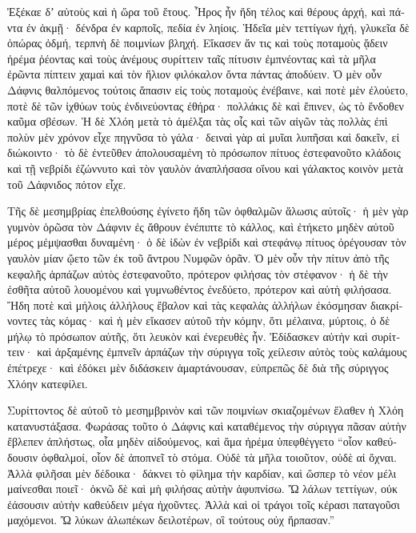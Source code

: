 \documentclass{book}
\begin{document}
\begin{pairs}
\begin{Leftside}
\begin{greek}
  Ἐξέκαε δʼ αὐτοὺς καὶ ἡ ὥρα τοῦ ἔτους. Ἦρος ἦν ἤδη τέλος καὶ θέρους ἀρχή, καὶ πάντα ἐν ἀκμῇ· δένδρα ἐν καρποῖς, πεδία ἐν ληίοις. Ἡδεῖα μὲν τεττίγων ἠχή, γλυκεῖα δὲ ὀπώρας ὀδμή, τερπνὴ δὲ ποιμνίων βληχή.  Εἴκασεν ἄν τις καὶ τοὺς ποταμοὺς ᾅδειν ἠρέμα ῥέοντας καὶ τοὺς ἀνέμους συρίττειν ταῖς πίτυσιν ἐμπνέοντας καὶ τὰ μῆλα ἐρῶντα πίπτειν χαμαὶ καὶ τὸν ἥλιον φιλόκαλον ὄντα πάντας ἀποδύειν. Ὁ μὲν οὖν Δάφνις θαλπόμενος τούτοις ἅπασιν εἰς τοὺς ποταμοὺς ἐνέβαινε, καὶ ποτὲ μὲν ἐλούετο, ποτὲ δὲ τῶν ἰχθύων τοὺς ἐνδινεύοντας ἐθήρα· πολλάκις δὲ καὶ ἔπινεν, ὡς τὸ ἔνδοθεν καῦμα σβέσων.  Ἡ δὲ Χλόη μετὰ τὸ ἀμέλξαι τὰς οἶς καὶ τῶν αἰγῶν τὰς πολλὰς ἐπὶ πολὺν μὲν χρόνον εἶχε πηγνῦσα τὸ γάλα· δειναὶ γὰρ αἱ μυῖαι λυπῆσαι καὶ δακεῖν, εἰ διώκοιντο· τὸ δὲ ἐντεῦθεν ἀπολουσαμένη τὸ πρόσωπον πίτυος ἐστεφανοῦτο κλάδοις καὶ τῇ νεβρίδι ἐζώννυτο καὶ τὸν γαυλὸν ἀναπλήσασα οἴνου καὶ γάλακτος κοινὸν μετὰ τοῦ Δάφνιδος πότον εἶχε.
\pend


  Τῆς δὲ μεσημβρίας ἐπελθούσης ἐγίνετο ἤδη τῶν ὀφθαλμῶν ἅλωσις αὐτοῖς· ἡ μὲν γὰρ γυμνὸν ὁρῶσα τὸν Δάφνιν ἐς ἄθρουν ἐνέπιπτε τὸ κάλλος, καὶ ἐτήκετο μηδὲν αὐτοῦ μέρος μέμψασθαι δυναμένη· ὁ δὲ ἰδὼν ἐν νεβρίδι καὶ στεφάνῳ πίτυος ὀρέγουσαν τὸν γαυλὸν μίαν ᾤετο τῶν ἐκ τοῦ ἄντρου Νυμφῶν ὁρᾶν.  Ὁ μὲν οὖν τὴν πίτυν ἀπὸ τῆς κεφαλῆς ἁρπάζων αὐτὸς ἐστεφανοῦτο, πρότερον φιλήσας τὸν στέφανον· ἡ δὲ τὴν ἐσθῆτα αὐτοῦ λουομένου καὶ γυμνωθέντος ἐνεδύετο, πρότερον καὶ αὐτὴ φιλήσασα.  Ἤδη ποτὲ καὶ μήλοις ἀλλήλους ἔβαλον καὶ τὰς κεφαλὰς ἀλλήλων ἐκόσμησαν διακρίνοντες τὰς κόμας· καὶ ἡ μὲν εἴκασεν αὐτοῦ τὴν κόμην, ὅτι μέλαινα, μύρτοις, ὁ δὲ μήλῳ τὸ πρόσωπον αὐτῆς, ὅτι λευκὸν καὶ ἐνερευθὲς ἦν.  Ἐδίδασκεν αὐτὴν καὶ συρίττειν· καὶ ἀρξαμένης ἐμπνεῖν ἁρπάζων τὴν σύριγγα τοῖς χείλεσιν αὐτὸς τοὺς καλάμους ἐπέτρεχε· καὶ ἐδόκει μὲν διδάσκειν ἁμαρτάνουσαν, εὐπρεπῶς δὲ διὰ τῆς σύριγγος Χλόην κατεφίλει.
\pend


  Συρίττοντος δὲ αὐτοῦ τὸ μεσημβρινὸν καὶ τῶν ποιμνίων σκιαζομένων ἔλαθεν ἡ Χλόη κατανυστάξασα. Φωράσας τοῦτο ὁ Δάφνις καὶ καταθέμενος τὴν σύριγγα πᾶσαν αὐτὴν ἔβλεπεν ἀπλήστως, οἷα μηδὲν αἰδούμενος, καὶ ἅμα ἠρέμα ὑπεφθέγγετο “οἷον καθεύδουσιν ὀφθαλμοί, οἷον δὲ ἀποπνεῖ τὸ στόμα.  Οὐδὲ τὰ μῆλα τοιοῦτον, οὐδὲ αἱ ὄχναι. Ἀλλὰ φιλῆσαι μὲν δέδοικα· δάκνει τὸ φίλημα τὴν καρδίαν, καὶ ὥσπερ τὸ νέον μέλι μαίνεσθαι ποιεῖ· ὀκνῶ δὲ καὶ μὴ φιλήσας αὐτὴν ἀφυπνίσω.  Ὤ λάλων τεττίγων, οὐκ ἐάσουσιν αὐτὴν καθεύδειν μέγα ἠχοῦντες. Ἀλλὰ καὶ οἱ τράγοι τοῖς κέρασι παταγοῦσι μαχόμενοι. Ὤ λύκων ἀλωπέκων δειλοτέρων, οἳ τούτους οὐχ ἥρπασαν.”
\pend



\end{greek}
\end{Leftside}
\end{pairs}
\end{document}
